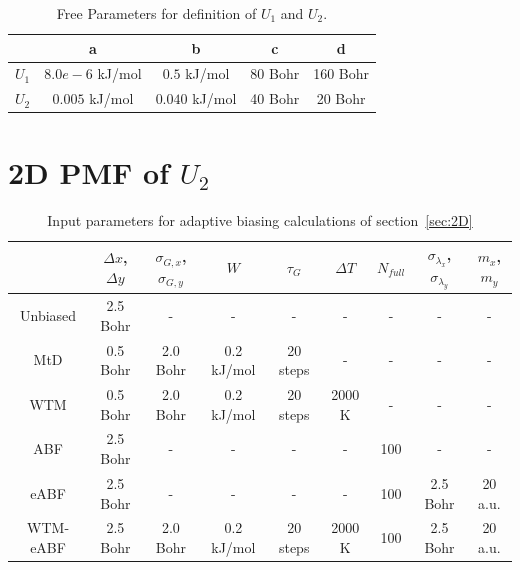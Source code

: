 \begin{table}[H]
      \centering
         \caption{Free Parameters for definition of $U_1$ and $U_2$.}
         \begin{tabular}{ c | c  c  c  c }
                 & a & b & c & d   \\
                 \hline
                 $U_1$  & $8.0e-6$ kJ/mol & $0.5$ kJ/mol & 80 Bohr & 160 Bohr \\
                 $U_2$  & $0.005$ kJ/mol  & $0.040$ kJ/mol & 40 Bohr & 20 Bohr \\
      \end{tabular}
      \label{tab:2D pots}
\end{table}

\section{2D PMF of $U_2$}
\begin{table}[H]
      \centering
         \caption{Input parameters for adaptive biasing calculations of section~\ref{sec:2D}}
         \begin{tabular}{ c | c  c  c  c  c c c c}
                 & $\Delta x$,$\Delta y$ & $\sigma_{G,x}$,$\sigma_{G,y}$ & $W$ & $\tau_G$ & $\Delta T$ & $N_{full}$ & $\sigma_{\lambda_{x}}$,$\sigma_{\lambda_y}$ & $m_x$,$m_y$   \\
                 \hline
            Unbiased & 2.5 Bohr & - & - & - & - & - & - & - \\
            MtD      & 0.5 Bohr & 2.0 Bohr & 0.2 kJ/mol & 20 steps & - & - & - & - \\
            WTM      & 0.5 Bohr & 2.0 Bohr & 0.2 kJ/mol & 20 steps & 2000 K & - & - & - \\
            ABF      & 2.5 Bohr &  -       & -          & -        & -      & 100 & - & - \\
            eABF     & 2.5 Bohr &  -       & -          & -        & -      & 100 & 2.5 Bohr & 20 a.u. \\
            WTM-eABF & 2.5 Bohr & 2.0 Bohr & 0.2 kJ/mol & 20 steps & 2000 K & 100 & 2.5 Bohr & 20 a.u. \\
      \end{tabular}
      \label{tab:2D params}
\end{table}
